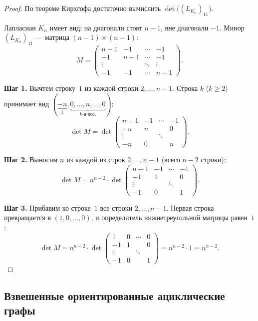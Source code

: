 \begin{proof}
	По теореме Кирхгофа достаточно вычислить $\det\!\bigl((L_{K_n})_{11}\bigr)$.
	
	Лапласиан $K_n$ имеет вид: на диагонали стоят $n{-}1$, вне диагонали $-1$. Минор
	$(L_{K_n})_{11}$ — матрица $(n{-}1)\times(n{-}1)$:
	\[
	M = \begin{pmatrix}
		n{-}1 & -1 & \cdots & -1 \\
		-1 & n{-}1 & \cdots & -1 \\
		\vdots & & \ddots & \vdots \\
		-1 & -1 & \cdots & n{-}1
	\end{pmatrix}.
	\]
	
	\textbf{Шаг 1.} Вычтем строку~$1$ из каждой строки $2, \ldots, n{-}1$. Строка $k$ ($k \ge 2$) принимает вид $(\underbrace{-n}_{1}, \underbrace{0, \ldots, n, \ldots, 0}_{k\text{-я поз.}})$:
	\[
	\det M = \det
	\begin{pmatrix}
		n{-}1 & -1 & \cdots & -1 \\
		-n & n & & 0 \\
		\vdots & & \ddots & \\
		-n & 0 & & n
	\end{pmatrix}.
	\]
	
	\textbf{Шаг 2.} Выносим $n$ из каждой из строк $2, \ldots, n{-}1$ (всего $n{-}2$ строки):
	\[
	\det M = n^{n-2} \cdot \det
	\begin{pmatrix}
		n{-}1 & -1 & \cdots & -1 \\
		-1 & 1 & & 0 \\
		\vdots & & \ddots & \\
		-1 & 0 & & 1
	\end{pmatrix}.
	\]
	
	\textbf{Шаг 3.} Прибавим ко строке~$1$ все строки $2, \ldots, n{-}1$. Первая строка превращается в $(1, 0, \ldots, 0)$, и определитель нижнетреугольной матрицы равен~$1$:
	\[
	\det M = n^{n-2} \cdot \det
	\begin{pmatrix}
		1 & 0 & \cdots & 0 \\
		-1 & 1 & & 0 \\
		\vdots & & \ddots & \\
		-1 & 0 & & 1
	\end{pmatrix}
	= n^{n-2} \cdot 1 = n^{n-2}. 
	\]
\end{proof}

\subsection{Взвешенные ориентированные ациклические графы}


